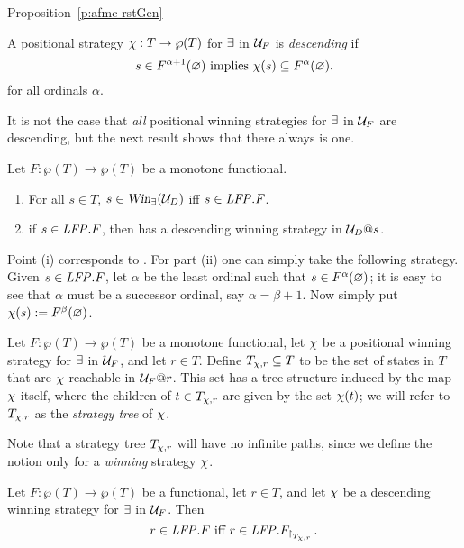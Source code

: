 \begin{proofof}{Proposition~\ref{p:afmc-rstGen}}
\begin{definition}
A positional strategy $\chi: T \to \wp(T)$ for $\exists$ in $\mathcal{U}_{F}$ is 
\emph{descending} if 
\begin{equation}
\label{eq:dec}
s \in F^{\alpha+1}(\nada) \text{ implies } \ystrat(s) \sse F^{\alpha}(\nada).
\end{equation}
for all ordinals $\alpha$.
\end{definition}

%
It is not the case that \emph{all} positional winning strategies for $\exists$ in 
$\mathcal{U}_{F}$ are descending, but the next result shows that there always is one.

\begin{claimfirst}
\label{p:unfg}
Let $F: \wp(T)\to \wp(T)$ be a monotone functional.
\begin{enumerate}
\item For all $s \in T$, $s \in \win_{\eloise}(\UG_{D})$ iff $s \in \mathit{LFP}. F$.
\item if $s \in \mathit{LFP}. F$, then \eloise has a descending winning strategy in $\mathcal{U}_{D}@s$.
\end{enumerate}
\end{claimfirst}
%
\begin{pfclaim}
Point (i) corresponds to \cite[Theorem 3.14(2)]{Ven08}.
For part (ii) one can simply take the following strategy.
Given $s \in \mathit{LFP}.F$, let $\alpha$ be the least ordinal such that $s \in 
F^{\alpha}(\varnothing)$; it is easy to see that $\alpha$ must be a successor ordinal,
say $\alpha = \beta + 1$. 
Now simply put $\chi(s) := F^{\beta}(\varnothing)$.
\end{pfclaim}

\begin{definition}
\label{d:str-tree}
Let $F: \wp(T)\to \wp(T)$ be a monotone functional, let $\chi$ be a 
positional winning strategy for $\exists$ in $\mathcal{U}_{F}$, and let $r \in T$. 
Define $T_{\chi,r} \subseteq T$ to be the set of states in $T$ that are 
$\chi$-reachable in $\mathcal{U}_{F}@r$.
This set has a tree structure induced by the map $\chi$ itself, where the 
children of $t \in T_{\chi,r}$ are given by the set $\chi(t)$; we will
refer to $T_{\chi,r}$ as the \emph{strategy tree} of
$\chi$.
\end{definition}


Note that a strategy tree $T_{\chi,r}$ will have no infinite 
paths, since we define the notion only for a \emph{winning} strategy 
$\chi$.

\begin{claimfirst}
\label{p:afmc-2}
Let $F: \wp(T)\to \wp(T)$ be a functional, let $r \in T$, and let $\chi$ 
be a descending winning strategy for $\exists$ in $\mathcal{U}_{F}$.
Then
\begin{equation}
\label{eq:afmc3}
r \in \LFP. F \text{ iff } r \in \LFP. F_{\rst{T_{\ystrat,r}}}.
\end{equation}
\end{claimfirst}


\end{proofof}
